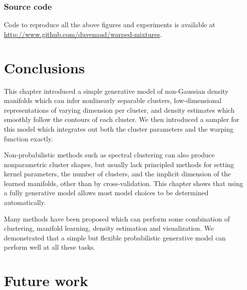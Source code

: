 \subsubsection{Source code}
Code to reproduce all the above figures and experiments is available at \\\url{http://www.github.com/duvenaud/warped-mixtures}.


\section{Conclusions}

This chapter introduced a simple generative model of non-Gaussian density manifolds which can infer nonlinearly separable clusters, low-dimensional representations of varying dimension per cluster, and density estimates which smoothly follow the contours of each cluster.
We then introduced a sampler for this model which integrates out both the cluster parameters and the warping function exactly.

Non-probabilistic methods such as spectral clustering can also produce nonparametric cluster shapes, but usually lack principled methods for setting kernel parameters, the number of clusters, and the implicit dimension of the learned manifolds, other than by cross-validation.
This chapter shows that using a fully generative model allows most model choices to be determined automatically.

Many methods have been proposed which can perform some combination of clustering, manifold learning, density estimation and visualization.
We demonstrated that a simple but flexible probabilistic generative model can perform well at all these tasks.



\section{Future work}


